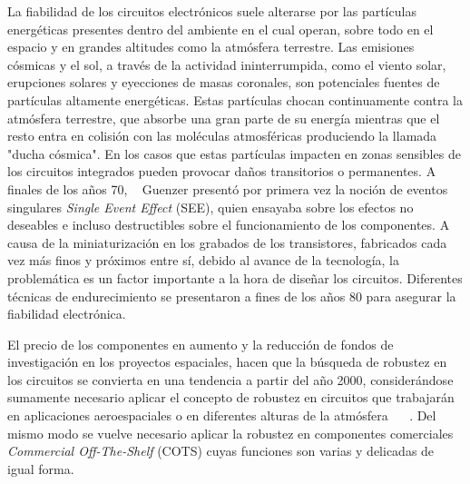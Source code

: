 \documentclass[a4paper,openright,12pt]{report}
\begin{document}
La fiabilidad de los circuitos electrónicos suele alterarse por las partículas energéticas presentes dentro del ambiente en el cual operan,  sobre todo en el espacio y en grandes altitudes como la atmósfera terrestre. Las emisiones cósmicas y el sol, a través de la actividad ininterrumpida, como el viento solar, erupciones solares y eyecciones de masas coronales, son potenciales fuentes de partículas altamente energéticas. Estas partículas chocan continuamente contra la atmósfera terrestre, que absorbe una gran parte de su energía mientras que el resto entra en colisión con las moléculas atmosféricas produciendo la llamada "ducha cósmica". En los casos que estas partículas impacten en  zonas sensibles de los circuitos integrados pueden provocar daños transitorios o permanentes. A finales de los años 70,  ~\cite{Guenzer1979} Guenzer presentó por primera vez la noción de eventos singulares \textit{Single Event Effect} (SEE), quien ensayaba sobre los efectos no deseables e incluso destructibles sobre el funcionamiento de los componentes. A causa de la miniaturización en los grabados de los transistores, fabricados cada vez más finos y próximos entre sí, debido al avance de la tecnología, la problemática es un  factor importante a la hora de diseñar los circuitos. Diferentes técnicas de endurecimiento se presentaron a fines de los años 80 para asegurar la fiabilidad electrónica.

El precio de los componentes en aumento y la reducción de fondos de investigación en los proyectos espaciales, hacen que la búsqueda de robustez en los circuitos se convierta en una tendencia a partir del año 2000, considerándose sumamente necesario aplicar el concepto de robustez en circuitos que trabajarán en  aplicaciones aeroespaciales o en diferentes alturas de la atmósfera  ~\cite{Chau2000} ~\cite{DiUbaldo2000}. Del mismo modo se vuelve  necesario aplicar la robustez en componentes comerciales \textit{Commercial Off-The-Shelf} (COTS) cuyas funciones son varias y  delicadas de igual forma. 
\end{document}
